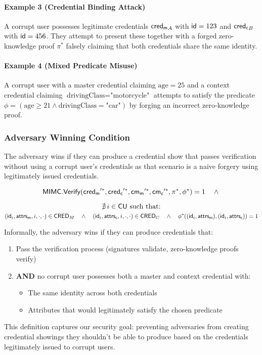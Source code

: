 \paragraph{Example 3 (Credential Binding Attack)} A corrupt user possesses legitimate credentials $\mathsf{cred_m}_A$ with $\mathsf{id}=123$ and $\mathsf{cred_c}_B$ with $\mathsf{id}=456$. They attempt to present these together with a forged zero-knowledge proof $\pi^*$ falsely claiming that both credentials share the same identity.

\paragraph{Example 4 (Mixed Predicate Misuse)} A corrupt user with a master credential claiming $\text{age}=25$ and a context credential claiming $\text{drivingClass}=\text{"motorcycle"}$ attempts to satisfy the predicate $\phi=(\text{age} \geq 21 \land \text{drivingClass} = \text{"car"})$ by forging an incorrect zero-knowledge proof.

\subsubsection{Adversary Winning Condition}
The adversary wins if they can produce a credential show that passes verification without using a corrupt user's credentials as that scenario is a naive forgery using legitimately issued credentials. 

\[
\mathsf{MIMC.Verify}(\mathsf{cred_m}'^*, \mathsf{cred_c}'^*, \mathsf{cm_m}'^*, \mathsf{cm_c}'^*, \pi^*, \phi^*) = 1 \quad \wedge\\
\]


\[
      \nexists\, i \in \mathsf{CU} \text{ such that:}\\
\]
\[
(\mathsf{id}_i, \mathsf{attrs_m}, i, \cdot, \cdot) \in \mathsf{CRED}_M \quad \wedge \quad (\mathsf{id}_i, \mathsf{attrs_c}, i, \cdot, \cdot) \in \mathsf{CRED}_C \quad \wedge \quad \phi^*((\mathsf{id}_i, \mathsf{attrs_m}), (\mathsf{id}_i, \mathsf{attrs_c})) = 1
\]

Informally, the adversary wins if they can produce credentials that:
\begin{enumerate}
    \item Pass the verification process (signatures validate, zero-knowledge proofs verify)
    \item \textbf{AND} no corrupt user possesses both a master and context credential with:
    \begin{itemize}
        \item The same identity across both credentials
        \item Attributes that would legitimately satisfy the chosen predicate
    \end{itemize}
\end{enumerate}
This definition captures our security goal: preventing adversaries from creating credential showings they shouldn't be able to produce based on the credentials legitimately issued to corrupt users.



